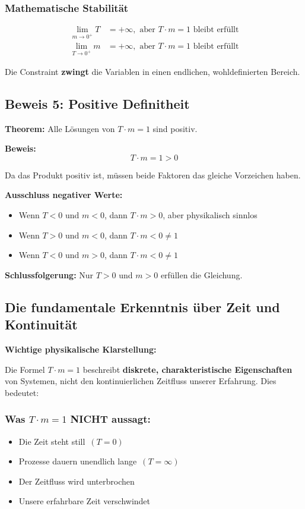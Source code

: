 \subsubsection{Mathematische Stabilität}
\begin{align}
	\lim_{m \to 0^+} T &= +\infty, \text{ aber } T \cdot m = 1 \text{ bleibt erfüllt}\\
	\lim_{T \to 0^+} m &= +\infty, \text{ aber } T \cdot m = 1 \text{ bleibt erfüllt}
\end{align}

Die Constraint \textbf{zwingt} die Variablen in einen endlichen, wohldefinierten Bereich.

\subsection{Beweis 5: Positive Definitheit}

\textbf{Theorem:} Alle Lösungen von $T \cdot m = 1$ sind positiv.

\textbf{Beweis:}
\begin{equation}
	T \cdot m = 1 > 0
\end{equation}

Da das Produkt positiv ist, müssen beide Faktoren das gleiche Vorzeichen haben.

\textbf{Ausschluss negativer Werte:}
\begin{itemize}
	\item Wenn $T < 0$ und $m < 0$, dann $T \cdot m > 0$, aber physikalisch sinnlos
	\item Wenn $T > 0$ und $m < 0$, dann $T \cdot m < 0 \neq 1$
	\item Wenn $T < 0$ und $m > 0$, dann $T \cdot m < 0 \neq 1$
\end{itemize}

\textbf{Schlussfolgerung:} Nur $T > 0$ und $m > 0$ erfüllen die Gleichung.

\subsection{Die fundamentale Erkenntnis über Zeit und Kontinuität}

\textbf{Wichtige physikalische Klarstellung:}

Die Formel $T \cdot m = 1$ beschreibt \textbf{diskrete, charakteristische Eigenschaften} von Systemen, nicht den kontinuierlichen Zeitfluss unserer Erfahrung. Dies bedeutet:

\subsubsection{Was $T \cdot m = 1$ NICHT aussagt:}
\begin{itemize}
	\item \glqq Die Zeit steht still\grqq\ $(T = 0)$
	\item \glqq Prozesse dauern unendlich lange\grqq\ $(T = \infty)$
	\item \glqq Der Zeitfluss wird unterbrochen\grqq
	\item \glqq Unsere erfahrbare Zeit verschwindet\grqq
\end{itemize}


